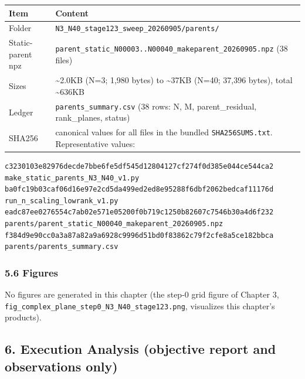 \documentclass[
  a4paper,
]{ltjsarticle}
\newcounter{none} %
\begin{document}
{\def\LTcaptype{none} %
\begin{longtable}[]{@{}
  >{\raggedright\arraybackslash}p{}
  >{\raggedright\arraybackslash}p{}@{}}
\toprule\noalign{}
\begin{minipage}[b]{\linewidth}\raggedright
Item
\end{minipage} & \begin{minipage}[b]{\linewidth}\raggedright
Content
\end{minipage} \\
\midrule\noalign{}
\endhead
\bottomrule\noalign{}
\endlastfoot
Folder & \texttt{N3\_N40\_stage123\_sweep\_20260905/parents/} \\
Static-parent npz &
\texttt{parent\_static\_N00003..N00040\_makeparent\_20260905.npz} (38
files) \\
Sizes & \textasciitilde2.0KB (N=3; 1,980 bytes) to \textasciitilde37KB
(N=40; 37,396 bytes), total \textasciitilde636KB \\
Ledger & \texttt{parents\_summary.csv} (38 rows: N, M, parent\_residual,
rank\_planes, status) \\
SHA256 & canonical values for all files in the bundled
\texttt{SHA256SUMS.txt}. Representative values: \\
\end{longtable}
}

\begin{verbatim}
c3230103e82976decde7bbe6fe5df545d12804127cf274f0d385e044ce544ca2  make_static_parents_N3_N40_v1.py
ba0fc19b03caf06d16e97e2cd5da499ed2ed8e95288f6dbf2062bedcaf11176d  run_n_scaling_lowrank_v1.py
eadc87ee0276554c7ab02e571e05200f0b719c1250b82607c7546b30a4d6f232  parents/parent_static_N00040_makeparent_20260905.npz
f384d9e90cc0a3a87a82a9a6928c9996d51bd0f83862c79f2cfe8a5ce182bbca  parents/parents_summary.csv
\end{verbatim}

\subsubsection{5.6 Figures}\label{figures}

No figures are generated in this chapter (the step-0 grid figure of
Chapter 3, \texttt{fig\_complex\_plane\_step0\_N3\_N40\_stage123.png},
visualizes this chapter's products).

\subsection{6. Execution Analysis (objective report and observations
only)}\label{execution-analysis-objective-report-and-observations-only}
\end{document}
